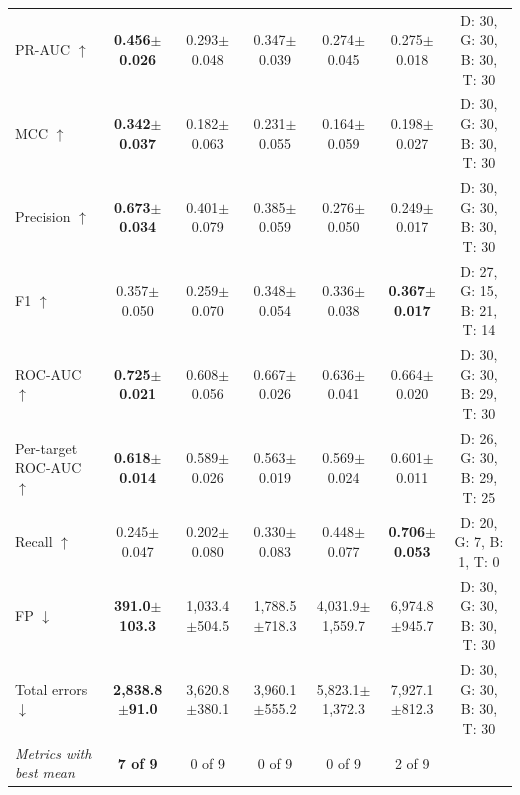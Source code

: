 \documentclass[11pt,letterpaper]{article}
\begin{document}
\begin{table}[!t]
{\begin{tabular}{l c c c c c c}
PR-AUC $\uparrow$ & \textbf{0.456$\pm$0.026} & 0.293$\pm$0.048 & 0.347$\pm$0.039 & 0.274$\pm$0.045 & 0.275$\pm$0.018 & D: 30, G: 30, B: 30, T: 30 \\
MCC $\uparrow$ & \textbf{0.342$\pm$0.037} & 0.182$\pm$0.063 & 0.231$\pm$0.055 & 0.164$\pm$0.059 & 0.198$\pm$0.027 & D: 30, G: 30, B: 30, T: 30 \\
Precision $\uparrow$ & \textbf{0.673$\pm$0.034} & 0.401$\pm$0.079 & 0.385$\pm$0.059 & 0.276$\pm$0.050 & 0.249$\pm$0.017 & D: 30, G: 30, B: 30, T: 30 \\
F1 $\uparrow$ & 0.357$\pm$0.050 & 0.259$\pm$0.070 & 0.348$\pm$0.054 & 0.336$\pm$0.038 & \textbf{0.367$\pm$0.017} & D: 27, G: 15, B: 21, T: 14 \\
ROC-AUC $\uparrow$ & \textbf{0.725$\pm$0.021} & 0.608$\pm$0.056 & 0.667$\pm$0.026 & 0.636$\pm$0.041 & 0.664$\pm$0.020 & D: 30, G: 30, B: 29, T: 30 \\
Per-target ROC-AUC $\uparrow$ & \textbf{0.618$\pm$0.014} & 0.589$\pm$0.026 & 0.563$\pm$0.019 & 0.569$\pm$0.024 & 0.601$\pm$0.011 & D: 26, G: 30, B: 29, T: 25 \\
Recall $\uparrow$ & 0.245$\pm$0.047 & 0.202$\pm$0.080 & 0.330$\pm$0.083 & 0.448$\pm$0.077 & \textbf{0.706$\pm$0.053} & D: 20, G: 7, B: 1, T: 0 \\
FP $\downarrow$ & \textbf{391.0$\pm$103.3} & 1,033.4$\pm$504.5 & 1,788.5$\pm$718.3 & 4,031.9$\pm$1,559.7 & 6,974.8$\pm$945.7 & D: 30, G: 30, B: 30, T: 30 \\
Total errors $\downarrow$ & \textbf{2,838.8$\pm$91.0} & 3,620.8$\pm$380.1 & 3,960.1$\pm$555.2 & 5,823.1$\pm$1,372.3 & 7,927.1$\pm$812.3 & D: 30, G: 30, B: 30, T: 30 \\
\textit{Metrics with best mean} & \textbf{7 of 9} & 0 of 9 & 0 of 9 & 0 of 9 & 2 of 9 & \\
\bottomrule
\end{tabular}}
\end{table}
\end{document}
